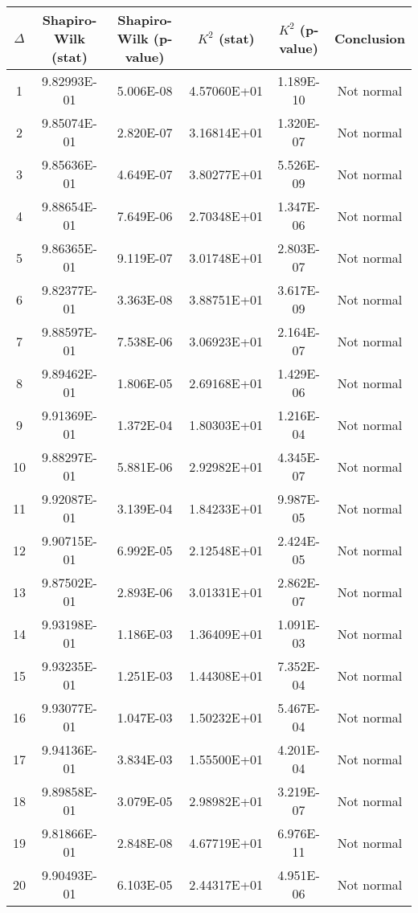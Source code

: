 \begin{table}[h]
	\begin{tabular}{|c|c|c|c|c|c|}
		\hline
		$\Delta$ &  Shapiro-Wilk (stat) & Shapiro-Wilk (p-value) & $K^2$ (stat) & $K^2$ (p-value) & Conclusion\\\hline
		\hline
		1 & 9.82993E-01 & 5.006E-08 & 4.57060E+01 & 1.189E-10 & Not normal\\\hline
		2 & 9.85074E-01 & 2.820E-07 & 3.16814E+01 & 1.320E-07 & Not normal\\\hline
		3 & 9.85636E-01 & 4.649E-07 & 3.80277E+01 & 5.526E-09 & Not normal\\\hline
		4 & 9.88654E-01 & 7.649E-06 & 2.70348E+01 & 1.347E-06 & Not normal\\\hline
		5 & 9.86365E-01 & 9.119E-07 & 3.01748E+01 & 2.803E-07 & Not normal\\\hline
		6 & 9.82377E-01 & 3.363E-08 & 3.88751E+01 & 3.617E-09 & Not normal\\\hline
		7 & 9.88597E-01 & 7.538E-06 & 3.06923E+01 & 2.164E-07 & Not normal\\\hline
		8 & 9.89462E-01 & 1.806E-05 & 2.69168E+01 & 1.429E-06 & Not normal\\\hline
		9 & 9.91369E-01 & 1.372E-04 & 1.80303E+01 & 1.216E-04 & Not normal\\\hline
		10 & 9.88297E-01 & 5.881E-06 & 2.92982E+01 & 4.345E-07 & Not normal\\\hline
		11 & 9.92087E-01 & 3.139E-04 & 1.84233E+01 & 9.987E-05 & Not normal\\\hline
		12 & 9.90715E-01 & 6.992E-05 & 2.12548E+01 & 2.424E-05 & Not normal\\\hline
		13 & 9.87502E-01 & 2.893E-06 & 3.01331E+01 & 2.862E-07 & Not normal\\\hline
		14 & 9.93198E-01 & 1.186E-03 & 1.36409E+01 & 1.091E-03 & Not normal\\\hline
		15 & 9.93235E-01 & 1.251E-03 & 1.44308E+01 & 7.352E-04 & Not normal\\\hline
		16 & 9.93077E-01 & 1.047E-03 & 1.50232E+01 & 5.467E-04 & Not normal\\\hline
		17 & 9.94136E-01 & 3.834E-03 & 1.55500E+01 & 4.201E-04 & Not normal\\\hline
		18 & 9.89858E-01 & 3.079E-05 & 2.98982E+01 & 3.219E-07 & Not normal\\\hline
		19 & 9.81866E-01 & 2.848E-08 & 4.67719E+01 & 6.976E-11 & Not normal\\\hline
		20 & 9.90493E-01 & 6.103E-05 & 2.44317E+01 & 4.951E-06 & Not normal\\\hline

\end{tabular}
\end{table}
